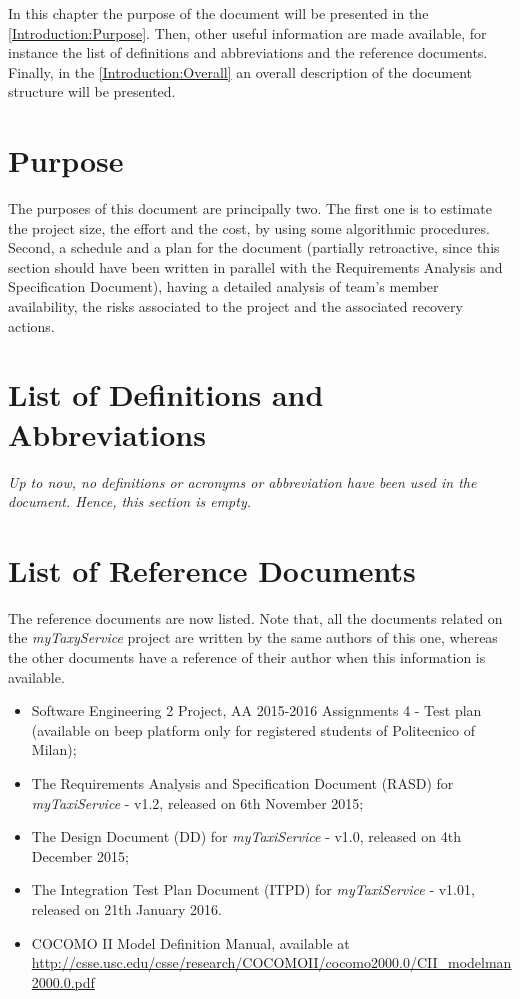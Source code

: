 \documentclass[\mainpath/main]{subfiles}
\begin{document}
\setmyfancystyle

In this chapter the purpose of the document will be presented in the \autoref{Introduction:Purpose}. Then, other useful information are made available, for instance the list of definitions and abbreviations and the reference documents. Finally, in the \autoref{Introduction:Overall} an overall description of the document structure will be presented.

\section{Purpose}
\label{Introduction:Purpose}
The purposes of this document are principally two. The first one is to estimate the project size, the effort and the cost, by using some algorithmic procedures. Second, a schedule and a plan for the document (partially retroactive, since this section should have been written in parallel with the Requirements Analysis and Specification Document), having a detailed analysis of team's member availability, the risks associated to the project and the associated recovery actions.

\section{List of Definitions and Abbreviations}
\label{Introduction:DefinitionsAndAbbrevations}
\textit{Up to now, no definitions or acronyms or abbreviation have been used in the document. Hence, this section is empty.}

\section{List of Reference Documents}
\label{Introduction:ReferenceDocuments}
The reference documents are now listed. Note that, all the documents related on the \textit{myTaxyService} project are written by the same authors of this one, whereas the other documents have a reference of their author when this information is available.\\
\begin{itemize}
	\item Software Engineering 2 Project, AA 2015-2016 Assignments 4 - Test plan (available on beep platform only for registered students of Politecnico of Milan);
	\item The Requirements Analysis and Specification Document (RASD) for \textit{myTaxiService} - v1.2, released on 6th November 2015;
	\item The Design Document (DD) for \textit{myTaxiService} - v1.0, released on 4th December 2015;
	\item The Integration Test Plan Document (ITPD) for \textit{myTaxiService} - v1.01, released on 21th January 2016.
	\item COCOMO II Model Definition Manual, available at \url{http://csse.usc.edu/csse/research/COCOMOII/cocomo2000.0/CII_modelman2000.0.pdf}
\end{itemize}
\end{document}

